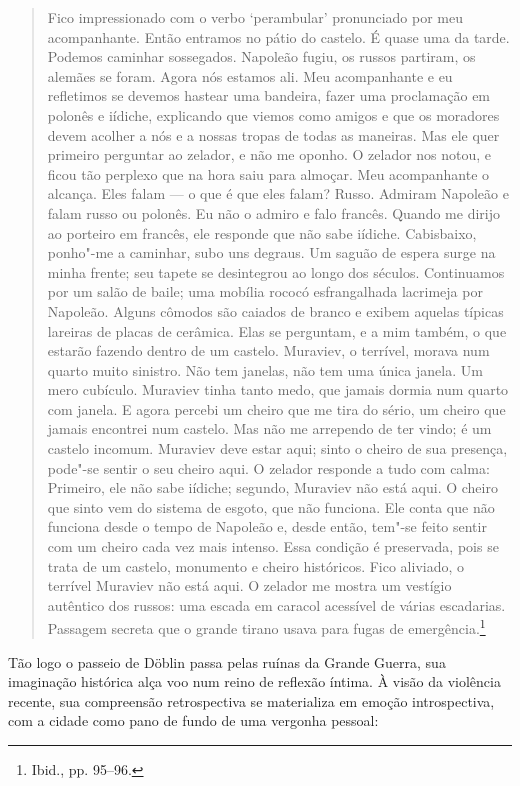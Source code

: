 \begin{quote}
Fico impressionado com o verbo `perambular' pronunciado por meu
acompanhante. Então entramos no pátio do castelo. É quase uma da tarde.
Podemos caminhar sossegados. Napoleão fugiu, os russos partiram, os
alemães se foram. Agora nós estamos ali. Meu acompanhante e eu
refletimos se devemos hastear uma bandeira, fazer uma proclamação em
polonês e iídiche, explicando que viemos como amigos e que os moradores
devem acolher a nós e a nossas tropas de todas as maneiras. Mas ele quer
primeiro perguntar ao zelador, e não me oponho. O zelador nos notou, e
ficou tão perplexo que na hora saiu para almoçar. Meu acompanhante o
alcança. Eles falam --- o que é que eles falam? Russo. Admiram Napoleão e
falam russo ou polonês. Eu não o admiro e falo francês. Quando me dirijo
ao porteiro em francês, ele responde que não sabe iídiche. Cabisbaixo,
ponho"-me a caminhar, subo uns degraus. Um saguão de espera surge na
minha frente; seu tapete se desintegrou ao longo dos séculos.
Continuamos por um salão de baile; uma mobília rococó esfrangalhada
lacrimeja por Napoleão. Alguns cômodos são caiados de branco e exibem
aquelas típicas lareiras de placas de cerâmica. Elas se perguntam, e a
mim também, o que estarão fazendo dentro de um castelo. Muraviev, o
terrível, morava num quarto muito sinistro. Não tem janelas, não tem uma
única janela. Um mero cubículo. Muraviev tinha tanto medo, que jamais
dormia num quarto com janela. E agora percebi um cheiro que me tira do
sério, um cheiro que jamais encontrei num castelo. Mas não me arrependo
de ter vindo; é um castelo incomum. Muraviev deve estar aqui; sinto o
cheiro de sua presença, pode"-se sentir o seu cheiro aqui. O zelador
responde a tudo com calma: Primeiro, ele não sabe iídiche; segundo,
Muraviev não está aqui. O cheiro que sinto vem do sistema de esgoto, que
não funciona. Ele conta que não funciona desde o tempo de Napoleão e,
desde então, tem"-se feito sentir com um cheiro cada vez mais intenso.
Essa condição é preservada, pois se trata de um castelo, monumento e
cheiro históricos. Fico aliviado, o terrível Muraviev não está aqui. O
zelador me mostra um vestígio autêntico dos russos: uma escada em
caracol acessível de várias escadarias. Passagem secreta que o grande
tirano usava para fugas de emergência.\footnote{Ibid., pp. 95--96.}
\end{quote}

Tão logo o passeio de Döblin passa pelas ruínas da Grande Guerra, sua
imaginação histórica alça voo num reino de reflexão íntima. À visão da
violência recente, sua compreensão retrospectiva se materializa em
emoção introspectiva, com a cidade como pano de fundo de uma vergonha
pessoal:


